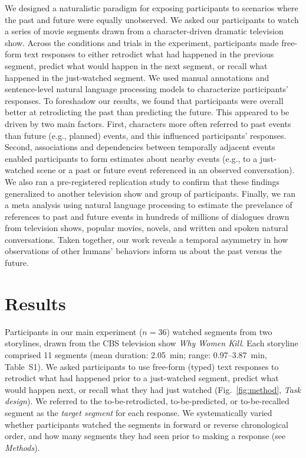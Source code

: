 \documentclass[10pt]{article}
\newcommand{\stimDescription}{S1}
\begin{document}
We designed a naturalistic paradigm for exposing participants to scenarios
where the past and future were equally unobserved. We asked our participants to
watch a series of movie segments drawn from a character-driven dramatic
television show. Across the conditions and trials in the experiment,
participants made free-form text responses to either retrodict what had
happened in the previous segment, predict what would happen in the next
segment, or recall what happened in the just-watched segment. We used manual
annotations and sentence-level natural language processing models to
characterize participants' responses. To foreshadow our results, we found that
participants were overall better at retrodicting the past than predicting the
future. This appeared to be driven by two main factors. First, characters more
often referred to past events than future (e.g., planned) events, and this
influenced participants' responses. Second, associations and dependencies
between temporally adjacent events enabled participants to form estimates about
nearby events (e.g., to a just-watched scene or a past or future event
referenced in an observed conversation). We also ran a pre-registered
replication study to confirm that these findings generalized to another
television show and group of participants. Finally, we ran a meta analysis
using natural language processing to estimate the prevelance of references to
past and future events in hundreds of millions of dialogues drawn from
television shows, popular movies, novels, and written and spoken natural
conversations. Taken together, our work reveals a temporal asymmetry in how
observations of other humans’ behaviors inform us about the past versus the
future.

\section*{Results}

Participants in our main experiment ($n = 36$) watched segments from two
storylines, drawn from the CBS television show \textit{Why Women Kill}. Each
storyline comprised 11 segments (mean duration: 2.05~min; range:
0.97--3.87~min, Table~\stimDescription). We asked participants to use free-form
(typed) text responses to retrodict what had happened prior to a just-watched
segment, predict what would happen next, or recall what they had just watched
(Fig.~\ref{fig:method}, \textit{Task design}). We referred to the
to-be-retrodicted, to-be-predicted, or to-be-recalled segment as the
\textit{target segment} for each response. We systematically varied whether
participants watched the segments in forward or reverse chronological order,
and how many segments they had seen prior to making a response (see
\textit{Methods}).
\end{document}
